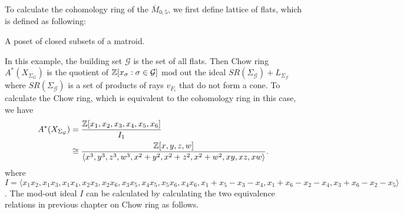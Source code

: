     To calculate the cohomology ring of the $\overline{M}_{0, 5}$,
    we first define lattice of flats, which is defined as following:
    \begin{definition}
        A poset of closed subsets of a matroid.    
    \end{definition}
    
    In this example, the building set $\mathcal{G}$ is the set of all flats.
    Then Chow ring $A^\ast(X_{\Sigma_G})$ is the quotient of $\mathbb{Z}[x_\sigma: \sigma \in \mathcal{G}]$ 
    mod out the ideal $SR(\Sigma_\mathcal{G}) + L_{\Sigma_{\mathcal{G}}}$
    where $SR(\Sigma_\mathcal{G})$ is a set of products of rays $v_{F_i}$ that do not form a cone. 
    To calculate the Chow ring, which is equivalent to the cohomology ring in this case, 
    we have 
    \begin{align*}
    	A^\ast(X_{\Sigma_\mathcal{G}}) &= \frac{\mathbb{Z}[x_1, x_2, x_3, x_4, x_5, x_6]}{I_1}\\
	&\cong \frac{\mathbb{Z}[x, y, z, w]}{\langle x^3, y^3, z^3, w^3, x^2 + y^2, x^2 + z^2, x^2 + w^2, xy, xz, xw \rangle}.
    \end{align*}
    where $I = \langle x_1x_2, x_1x_3, x_1x_4, x_2x_3, x_2x_6, x_3x_5, x_4x_5, x_5x_6, x_4x_6, x_1 + x_5 - x_3 - x_4, x_1 + x_6 - x_2 - x_4, x_3 + x_6 - x_2 - x_5 \rangle$.
    The mod-out ideal $I$ can be calculated by calculating 
    the two equivalence relations in previous chapter on Chow ring as follows.
